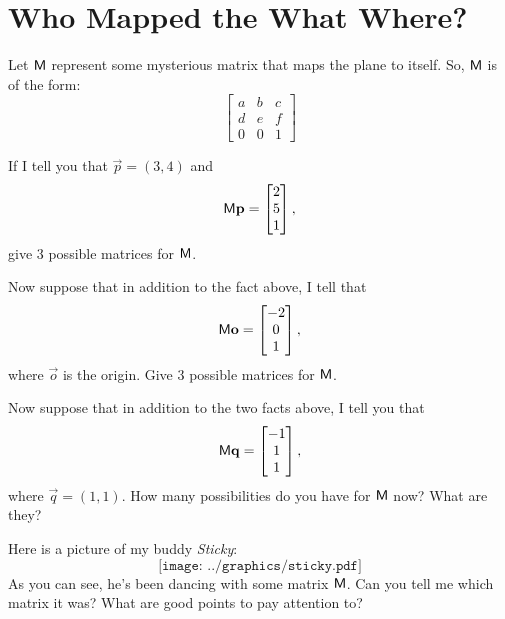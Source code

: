 \newpage
\section{Who Mapped the What Where?} 
                                  

Let $\mathsf{M}$ represent some mysterious matrix that maps the plane to itself.
So, $\mathsf{M}$ is of the form:
\[
\begin{bmatrix}
a & b & c \\
d & e & f \\
0 & 0 & 1
\end{bmatrix}
\]

\begin{prob} 
If I tell you that $\vec{p} = (3,4)$ and 
\[
\mathsf{M}\mathbf{p} = \begin{bmatrix}2\\ 5\\ 1\end{bmatrix},
\]
give $3$ possible matrices for $\mathsf{M}$.
\end{prob}

\begin{prob} 
Now suppose that in addition to the fact above, I tell that
\[
\mathsf{M}\mathbf{o} = \begin{bmatrix}-2\\ 0\\ 1\end{bmatrix},
\]
where $\vec{o}$ is the origin.  Give $3$ possible matrices for
$\mathsf{M}$.
\end{prob}


\begin{prob} 
Now suppose that in addition to the two facts above, I tell you that 
\[
\mathsf{M}\mathbf{q} = \begin{bmatrix}-1\\ 1\\ 1\end{bmatrix},
\]
where $\vec{q} = (1,1)$.  How many possibilities do you have for
$\mathsf{M}$ now? What are they?
\end{prob}

\begin{prob}
Here is a picture of my buddy \textit{Sticky}:
\[
\texttt{[image: ../graphics/sticky.pdf]}
\]
As you can see, he's been dancing with some matrix $\mathsf{M}$. Can you
tell me which matrix it was? What are good points to pay attention to?
\end{prob}


